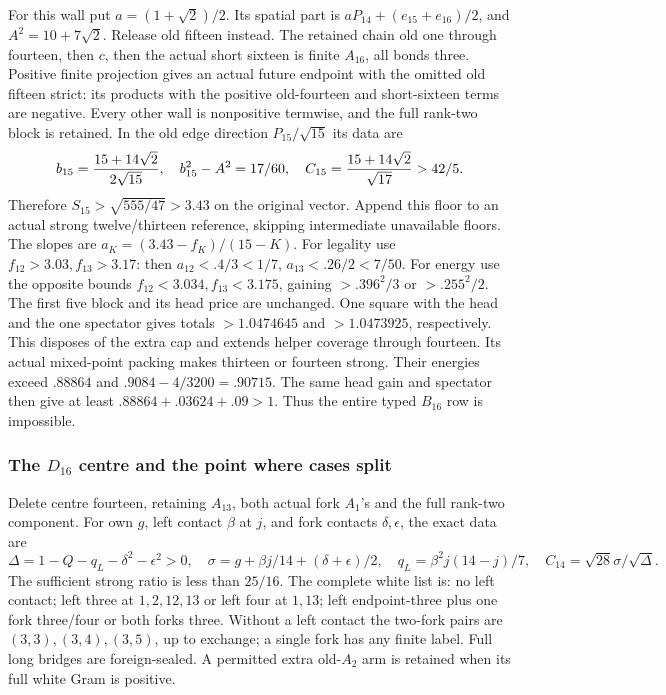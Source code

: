 For this wall put \(a=(1+\sqrt2)/2\). Its spatial part is
\(aP_{14}+(e_{15}+e_{16})/2\), and \(A^2=10+7\sqrt2\).
Release old fifteen instead. The retained chain
old one through fourteen, then \(c\), then the actual short sixteen
is finite \(A_{16}\), all bonds three. Positive finite projection
gives an actual future endpoint with the omitted old fifteen strict:
its products with the positive old-fourteen and short-sixteen terms
are negative. Every other wall is nonpositive termwise, and the full
rank-two block is retained. In the old edge direction
\(P_{15}/\sqrt{15}\) its data are
\[
 b_{15}={15+14\sqrt2\over2\sqrt{15}},\quad
 b_{15}^2-A^2=17/60,\quad
 C_{15}={15+14\sqrt2\over\sqrt{17}}>42/5.
\]
Therefore \(S_{15}>\sqrt{555/47}>3.43\) on the original vector.
Append this floor to an actual strong twelve/thirteen reference,
skipping intermediate unavailable floors. The slopes are
\(a_K=(3.43-f_K)/(15-K)\). For legality use
\(f_{12}>3.03,f_{13}>3.17\): then
\(a_{12}<.4/3<1/7\), \(a_{13}<.26/2<7/50\).
For energy use the opposite bounds
\(f_{12}<3.034,f_{13}<3.175\), gaining
\(>.396^2/3\) or \(>.255^2/2\).
The first five block and its head price are unchanged. One square
with the head and the one spectator gives totals
\(>1.0474645\) and \(>1.0473925\), respectively.
This disposes of the extra cap and extends helper coverage through
fourteen. Its actual mixed-point packing makes thirteen or fourteen
strong. Their energies exceed \(.88864\) and
\(.9084-4/3200=.90715\). The same head gain and spectator
then give at least \(.88864+.03624+.09>1\).
Thus the entire typed \(B_{16}\) row is impossible.

\subsubsection{The \(D_{16}\) centre and the point where cases split}
Delete centre fourteen, retaining \(A_{13}\), both actual fork
\(A_1\)'s and the full rank-two component. For own \(g\), left
contact \(\beta\) at \(j\), and fork contacts \(\delta,\epsilon\),
the exact data are
\[
 \Delta=1-Q-q_L-\delta^2-\epsilon^2>0,\quad
 \sigma=g+\beta j/14+(\delta+\epsilon)/2,\quad
 q_L=\beta^2j(14-j)/7,\quad C_{14}=\sqrt{28}\sigma/\sqrt\Delta.
\]
The sufficient strong ratio is less than \(25/16\).
The complete white list is: no left contact; left three at
\(1,2,12,13\) or left four at \(1,13\); left endpoint-three
plus one fork three/four or both forks three. Without a left
contact the two-fork pairs are \((3,3),(3,4),(3,5)\), up to
exchange; a single fork has any finite label. Full long bridges
are foreign-sealed. A permitted extra old-\(A_2\) arm is retained
when its full white Gram is positive.

